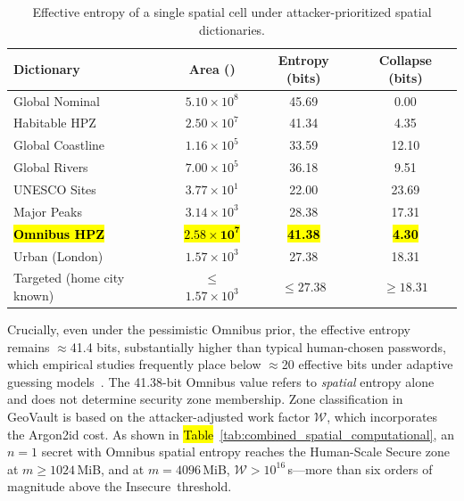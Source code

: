 \documentclass[mathematics,article,accept,pdftex,moreauthors]{Definitions/mdpi}
\begin{document}
\begin{table}[H]
\caption{Effective entropy of a single spatial cell under attacker-prioritized spatial dictionaries.}
\label{tab:entropy_dictionaries}
\begin{tabularx}{\linewidth}{l CCC}
\toprule
\textbf{Dictionary} & \textbf{Area ()} & \textbf{Entropy (bits)} & \textbf{Collapse (bits)} \\
\midrule
Global Nominal & $5.10\times10^{8}$ & 45.69 & 0.00 \\
Habitable HPZ & $2.50\times10^{7}$ & 41.34 & 4.35 \\
Global Coastline & $1.16\times10^{5}$ & 33.59 & 12.10 \\
Global Rivers & $7.00\times10^{5}$ & 36.18 & 9.51 \\
UNESCO Sites & $3.77\times10^{1}$ & 22.00 & 23.69 \\
Major Peaks & $3.14\times10^{3}$ & 28.38 & 17.31 \\
\textbf{\hl{Omnibus HPZ}} & \hl{$\mathbf{2.58\times10^{7}}$} & \textbf{\hl{41.38}} & \textbf{\hl{4.30}} \\
Urban (London) & $1.57\times10^{3}$ & 27.38 & 18.31 \\
{Targeted (home city known)} & {$\le$$1.57\times10^{3}$} & {$\le$$27.38$} & {$\ge$$18.31$} \\
\bottomrule
\end{tabularx}
\end{table}

Crucially, even under the pessimistic Omnibus prior, the effective entropy remains $\approx$41.4 bits, substantially higher than typical human-chosen passwords, which empirical studies frequently place below $\approx$20 effective bits under adaptive guessing models~\cite{Bonneau2012}. {The 41.38-bit Omnibus value refers to \emph{spatial} entropy alone and does not determine security zone membership. Zone classification in GeoVault is based on the attacker-adjusted work factor $\mathcal{W}$, which incorporates the Argon2id cost. As shown in \hl{Table}~\ref{tab:combined_spatial_computational},  %
an $n=1$ secret with Omnibus spatial entropy reaches the Human-Scale Secure zone at \mbox{$m \geq 1024$\,MiB}, and at \mbox{$m=4096$\,MiB}, $\mathcal{W} > 10^{16}$\,s---more than six orders of magnitude above the \mbox{Insecure threshold.}}
\end{document}
